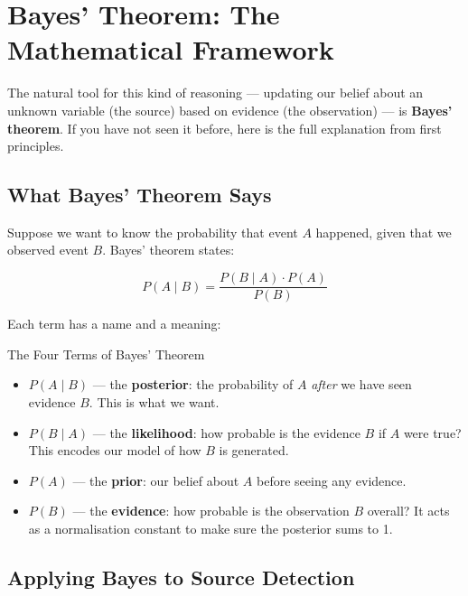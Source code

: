 \section{Bayes' Theorem: The Mathematical Framework}
\label{sec:bayes}

The natural tool for this kind of reasoning — updating our belief about an
unknown variable (the source) based on evidence (the observation) — is
\textbf{Bayes' theorem}. If you have not seen it before, here is the full
explanation from first principles.

\subsection{What Bayes' Theorem Says}

Suppose we want to know the probability that event $A$ happened, given that
we observed event $B$. Bayes' theorem states:

\begin{equation}
    P(A \mid B) = \frac{P(B \mid A) \cdot P(A)}{P(B)}
    \label{eq:bayes-general}
\end{equation}

Each term has a name and a meaning:

\begin{conceptbox}{The Four Terms of Bayes' Theorem}
\begin{itemize}
    \item $P(A \mid B)$ — the \textbf{posterior}: the probability of $A$
    \emph{after} we have seen evidence $B$. This is what we want.

    \item $P(B \mid A)$ — the \textbf{likelihood}: how probable is the
    evidence $B$ if $A$ were true? This encodes our model of how $B$ is
    generated.

    \item $P(A)$ — the \textbf{prior}: our belief about $A$ before seeing
    any evidence.

    \item $P(B)$ — the \textbf{evidence}: how probable is the observation
    $B$ overall? It acts as a normalisation constant to make sure the
    posterior sums to 1.
\end{itemize}
\end{conceptbox}

\subsection{Applying Bayes to Source Detection}

